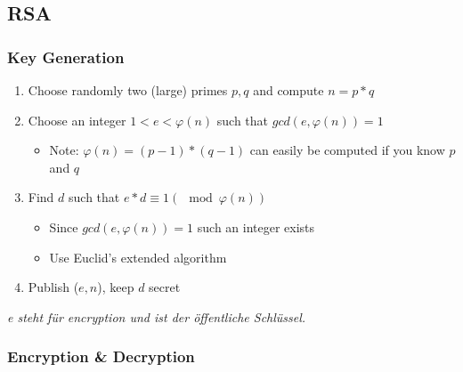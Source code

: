 \subsection{RSA}
\subsubsection{Key Generation}

\begin{enumerate}
    \item Choose randomly two (large) primes $p, q$ and compute $n = p*q$
    \item Choose an integer $1 < e < \varphi(n)$ such that $gcd(e, \varphi(n)) = 1$
    \begin{itemize}
        \item Note: $\varphi(n) = (p - 1)*(q - 1)$ can easily be computed if you know $p$ and $q$ 
    \end{itemize}
    \item Find $d$ such that $e*d \equiv 1 (\mod \varphi(n))$
    \begin{itemize}
        \item Since $gcd(e, \varphi(n)) = 1$ such an integer exists
        \item Use Euclid's extended algorithm
    \end{itemize}
    \item Publish ($e, n$), keep $d$ secret
\end{enumerate}

\emph{e steht für encryption und ist der öffentliche Schlüssel.}

\hypertarget{encryption-decryption}{%
\subsubsection{Encryption \& Decryption}\label{encryption-decryption}}

